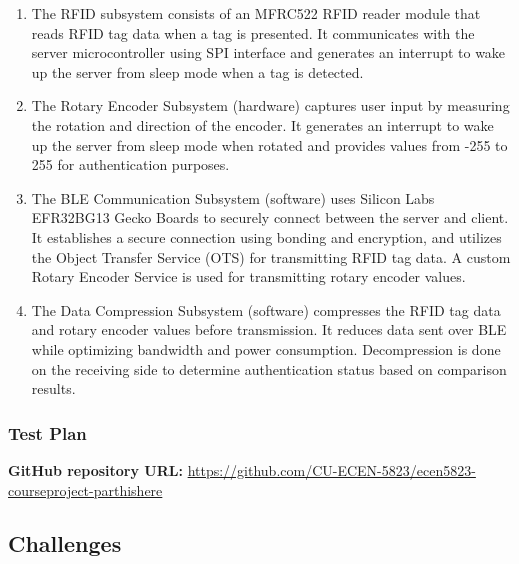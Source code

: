 \documentclass[a4paper,11pt]{article}%
\begin{document}
\begin{enumerate}
    \item The RFID subsystem consists of an MFRC522 RFID reader module that reads RFID tag data when a tag is presented. It communicates with the server microcontroller using SPI interface and generates an interrupt to wake up the server from sleep mode when a tag is detected.

    \item The Rotary Encoder Subsystem (hardware) captures user input by measuring the rotation and direction of the encoder. It generates an interrupt to wake up the server from sleep mode when rotated and provides values from -255 to 255 for authentication purposes.
    
    \item The BLE Communication Subsystem (software) uses Silicon Labs EFR32BG13 Gecko Boards to securely connect between the server and client. It establishes a secure connection using bonding and encryption, and utilizes the Object Transfer Service (OTS) for transmitting RFID tag data. A custom Rotary Encoder Service is used for transmitting rotary encoder values.
    
    \item The Data Compression Subsystem (software) compresses the RFID tag data and rotary encoder values before transmission. It reduces data sent over BLE while optimizing bandwidth and power consumption. Decompression is done on the receiving side to determine authentication status based on comparison results.
\end{enumerate}



\subsubsection{Test Plan}




\textbf{GitHub repository URL:} \href{https://github.com/CU-ECEN-5823/ecen5823-courseproject-parthishere}{https://github.com/CU-ECEN-5823/ecen5823-courseproject-parthishere}



\subsection{Challenges}
\end{document}
